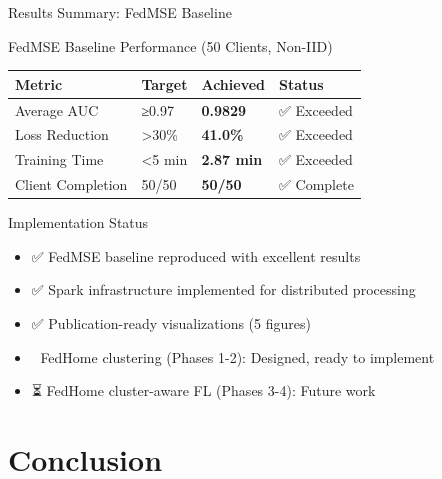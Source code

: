 \documentclass[10pt, aspectratio=169]{beamer}
\begin{document}
\begin{frame}{Results Summary: FedMSE Baseline}
    \begin{block}{FedMSE Baseline Performance (50 Clients, Non-IID)}
        \begin{table}
            \centering
            \begin{tabular}{@{}llll@{}}
                \toprule
                \textbf{Metric} & \textbf{Target} & \textbf{Achieved} & \textbf{Status} \\
                \midrule
                Average AUC & ≥0.97 & \textbf{0.9829} & ✅ Exceeded \\
                Loss Reduction & >30\% & \textbf{41.0\%} & ✅ Exceeded \\
                Training Time & <5 min & \textbf{2.87 min} & ✅ Exceeded \\
                Client Completion & 50/50 & \textbf{50/50} & ✅ Complete \\
                \bottomrule
            \end{tabular}
        \end{table}
    \end{block}
    
    \vspace{0.5cm}
    
    \begin{alertblock}{Implementation Status}
        \begin{itemize}
            \item ✅ FedMSE baseline reproduced with excellent results
            \item ✅ Spark infrastructure implemented for distributed processing
            \item ✅ Publication-ready visualizations (5 figures)
            \item 🔄 FedHome clustering (Phases 1-2): Designed, ready to implement
            \item ⏳ FedHome cluster-aware FL (Phases 3-4): Future work
        \end{itemize}
    \end{alertblock}
\end{frame}


\section{Conclusion}
\end{document}
